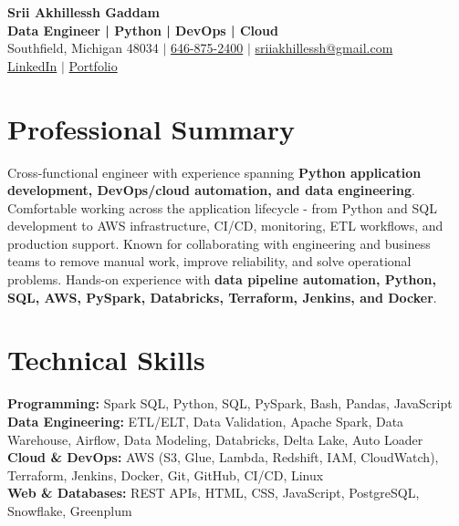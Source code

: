 \documentclass[letterpaper,10pt]{article}
\begin{document}
\fontsize{9.35pt}{10.45pt}\selectfont

\begin{center}
    {\LARGE \textbf{Srii Akhillessh Gaddam}} \\[-1pt]
    \textbf{Data Engineer | Python | DevOps | Cloud} \\[2pt]
    Southfield, Michigan 48034 $|$
    \href{tel:6468752400}{646-875-2400} $|$
    \href{mailto:sriiakhillessh@gmail.com}{sriiakhillessh@gmail.com} \\[1pt]
    \href{https://www.linkedin.com/in/srii-akhiilessh-gaddam-b48668191/}{LinkedIn} $|$
    \href{https://sriiakhillesshg.github.io/portfolio/}{Portfolio}
\end{center}
\vspace{-8pt}

\section{Professional Summary}
\small{Cross-functional engineer with experience spanning \textbf{Python application development, DevOps/cloud automation, and data engineering}. Comfortable working across the application lifecycle - from Python and SQL development to AWS infrastructure, CI/CD, monitoring, ETL workflows, and production support. Known for collaborating with engineering and business teams to remove manual work, improve reliability, and solve operational problems. Hands-on experience with \textbf{data pipeline automation, Python, SQL, AWS, PySpark, Databricks, Terraform, Jenkins, and Docker}.}

\section{Technical Skills}
\small{
\textbf{Programming:} Spark SQL, Python, SQL, PySpark, Bash, Pandas, JavaScript \\
\textbf{Data Engineering:} ETL/ELT, Data Validation, Apache Spark, Data Warehouse, Airflow, Data Modeling, Databricks, Delta Lake, Auto Loader \\
\textbf{Cloud \& DevOps:} AWS (S3, Glue, Lambda, Redshift, IAM, CloudWatch), Terraform, Jenkins, Docker, Git, GitHub, CI/CD, Linux \\
\textbf{Web \& Databases:} REST APIs, HTML, CSS, JavaScript, PostgreSQL, Snowflake, Greenplum
}
\end{document}
